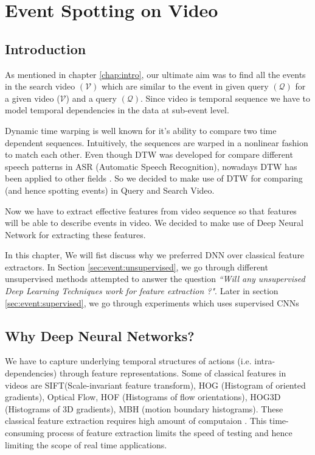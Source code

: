\chapter{Event Spotting on Video}
\label{chap:event}

\section{Introduction}
As mentioned in chapter \ref{chap:intro}, our ultimate aim was to find all the events in the search video $(\mathcal{V})$ which are similar to the event in given query $(\mathcal{Q})$  for a given video ($\mathcal{V}$) and a query $(\mathcal{Q})$. Since video is temporal sequence we have to model temporal dependencies
in the data at sub-event level. 

Dynamic time warping is well known for it's ability to compare two time dependent sequences. Intuitively, the sequences are warped in a nonlinear fashion to match each other. Even though DTW was developed for compare different speech patterns in ASR (Automatic Speech Recognition), nowadays DTW has been applied to other fields \cite{muller2007information}.  So we decided to make use of DTW for comparing (and hence spotting events) in Query and Search Video.

Now we have to extract effective features from video sequence so that features will be able to describe events  in video. We decided to make use of Deep Neural Network for extracting these features. 

In this chapter, We will fist discuss why we preferred  DNN over classical feature extractors. In Section \ref{sec:event:unsupervised}, we go through different unsupervised methods attempted to answer the question \textit{``Will any unsupervised Deep Learning Techniques work for feature extraction ?"}. Later in section \ref{sec:event:supervised}, we go through experiments which uses supervised CNNs  

\section{Why Deep Neural Networks?}
\label{sec:event:why}
We have to capture underlying temporal structures of actions (i.e. intra-dependencies) through feature representations. Some of classical features in videos are SIFT(Scale-invariant feature transform), HOG (Histogram of oriented gradients), Optical Flow, HOF (Histograms of flow orientations), HOG3D (Histograms of 3D gradients), MBH (motion boundary histograms). These classical feature extraction requires high amount of computaion \cite{baker2011database,chatfield2011devil}. This time-consuming process of feature extraction limits the speed of testing and hence limiting the scope of real time applications.

